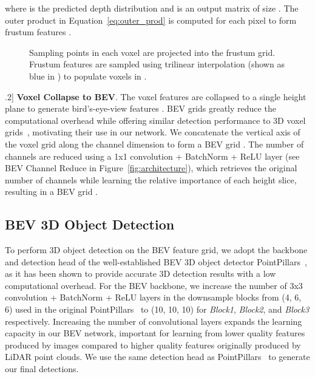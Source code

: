 \documentclass[final]{cvpr}
\begin{document}
\noindent
where  is the predicted depth distribution and  is an output matrix of size . The outer product in Equation~\ref{eq:outer_prod} is computed for each pixel to form frustum features .
\begin{figure}
\begin{center}

\end{center}
 \caption{Sampling points in each voxel are projected into the frustum grid. Frustum features are sampled using trilinear interpolation (shown as blue in ) to populate voxels in .}
\label{fig:frustum2voxel}
\end{figure}
\0.2\baselineskip]
\noindent \textbf{Voxel Collapse to BEV}.
The voxel features  are collapsed to a single height plane to generate bird's-eye-view features . BEV grids greatly reduce the computational overhead while offering similar detection performance to 3D voxel grids~\cite{PointPillars}, motivating their use in our network. We concatenate the vertical axis  of the voxel grid  along the channel dimension  to form a BEV grid . The number of channels are reduced using a 1x1 convolution + BatchNorm + ReLU layer (see BEV Channel Reduce in Figure~\ref{fig:architecture}), which retrieves the original number of channels  while learning the relative importance of each height slice, resulting in a BEV grid .
\subsection{BEV 3D Object Detection} \label{BEV 3D Object Detection}
To perform 3D object detection on the BEV feature grid, we adopt the backbone and detection head of the well-established BEV 3D object detector PointPillars~\cite{PointPillars}, as it has been shown to provide accurate 3D detection results with a low computational overhead.  For the BEV backbone, we increase the number of 3x3 convolution + BatchNorm + ReLU layers in the downsample blocks from (4, 6, 6) used in the original PointPillars~\cite{PointPillars} to (10, 10, 10) for \textit{Block1}, \textit{Block2}, and \textit{Block3} respectively. Increasing the number of convolutional layers expands the learning capacity in our BEV network, important for learning from lower quality features produced by images compared to higher quality features originally produced by LiDAR point clouds. We use the same detection head as PointPillars~\cite{PointPillars} to generate our final detections.
\end{document}
